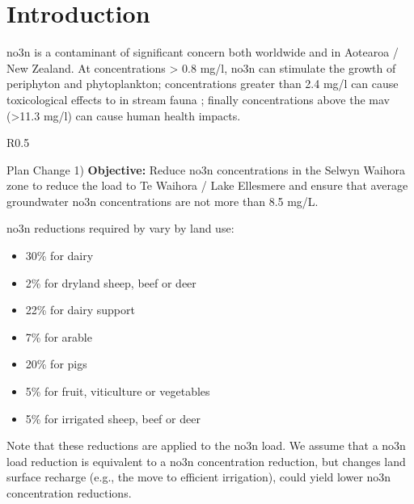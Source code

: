 
\section[Introduction]{Introduction} \label{sec:intro}

\gls{no3n} is a contaminant of significant concern both worldwide and in Aotearoa / New Zealand.
At concentrations > 0.8 mg/l, \gls{no3n} can stimulate the growth of periphyton and phytoplankton\citep{mcdowell_global_2020}; concentrations greater than 2.4 mg/l can cause toxicological effects to in stream fauna
\citep{camargo_nitrate_2005, horak_assessing_2019,wagenhoff_identifying_2017};
finally concentrations above the \gls{mav} (>11.3 mg/l) can cause human health impacts\citep{rahman_anthropogenic_2021}.

\begin{wrapfigure}{R}{0.5\textwidth}
    \begin{breakawaybox}[label={box:no3_red}]{Plan Change 1)}
        \textbf{Objective:} Reduce \gls{no3n} concentrations in the Selwyn Waihora zone to reduce the load to Te Waihora / Lake Ellesmere and ensure that average groundwater \gls{no3n} concentrations are not more than 8.5 mg/L.

        \gls{no3n} reductions required by  vary by land use:
        \begin{itemize}
            \item 30\% for dairy
            \item 2\% for dryland sheep, beef or deer
            \item 22\% for dairy support
            \item 7\% for arable
            \item 20\% for pigs
            \item 5\% for fruit, viticulture or vegetables
            \item 5\% for irrigated sheep, beef or deer
        \end{itemize}

        Note that these reductions are applied to the \gls{no3n} load.
        We assume that a \gls{no3n} load reduction is equivalent to a \gls{no3n} concentration reduction, but changes land surface recharge (e.g., the move to efficient irrigation), could yield lower \gls{no3n} concentration reductions.
    \end{breakawaybox}
\end{wrapfigure}

